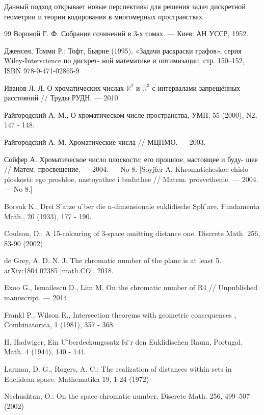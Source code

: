 \documentclass[12pt]{article}
\begin{document}
Данный подход открывает новые перспективы для решения задач дискретной геометрии и теории кодирования в многомерных пространствах.




\begin{thebibliography}{99}
Вороной Г. Ф. Собрание сочинений в 3-х томах. — Киев: АН УССР, 1952.

  Дженсен, Томми Р.; Тофт, Бьярне
(1995), «Задачи раскраски графов», серия Wiley-Interscience по дискрет-
ной математике и оптимизации, стр. 150–152, ISBN 978-0-471-02865-9

Иванов Л. Л. О хроматических числах 
$\mathbb{R}^2$ и $\mathbb{R}^3$
  с интервалами запрещённых расстояний // Труды РУДН. — 2010.

Райгородский А. М., О хроматическом числе пространства, УМН, 55 (2000), N2, 147 - 148.

Райгородский А. М. Хроматические числа // МЦНМО. — 2003.

Сойфер А. Хроматическое число плоскости: его прошлое, настоящее и буду- щее // Матем. просвещение. — 2004. — No 8. [Soyjfer A. Khromaticheskoe chislo ploskosti: ego proshloe, nastoyathee i buduthee // Matem. prosvethenie. — 2004. — No 8.]

Borsuk K.,  Drei S ̈atze u ̈ber die n-dimensionale euklidische Sph ̈are, Fundamenta Math., 20 (1933), 177 - 190.

Coulson, D.: A 15-colouring of 3-space omitting distance one. Discrete Math. 256, 83-90 (2002)

de Grey, A. D. N. J.
The chromatic number of the plane is at least 5.
arXiv:1804.02385 [math.CO], 2018.

Exoo G., Ismailescu D., Lim M. On the chromatic number of R4 // Unpublished manuscript. — 2014

Frankl P., Wilson R., Intersection theorems with geometric consequences , Combinatorica, 1 (1981), 357 - 368.

H. Hadwiger, Ein U ̈berdeckungssatz fu ̈r den Euklidischen Raum, Portugal. Math. 4 (1944), 140 - 144.

Larman, D. G., Rogers, A. C.: The realization of distances within sets in Euclidean space.
Mathematika 19, 1-24 (1972)

Nechushtan, O.: On the space chromatic number. Discrete Math. 256, 499–507 (2002)


\end{thebibliography}
\end{document}
